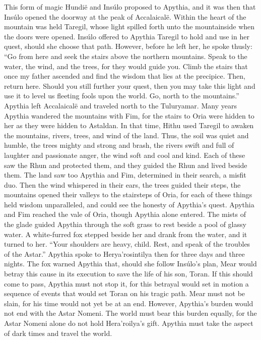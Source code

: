 \documentclass[smalldemyvopaper,11pt,twoside,onecolumn,openright,extrafontsizes]{memoir}
\begin{document}
This form of magic Hundië and Insúlo proposed to Apythia, and it was then that Insúlo opened the doorway at the peak of Accalaicalë. Within the heart of the mountain was held Taregil, whose light spilled forth unto the mountainside when the doors were opened. Insúlo offered to Apythia Taregil to hold and use in her quest, should she choose that path. However, before he left her, he spoke thusly:
“Go from here and seek the stairs above the northern mountains. Speak to the water, the wind, and the trees, for they would guide you. Climb the stairs that once my father ascended and find the wisdom that lies at the precipice. Then, return here. Should you still further your quest, then you may take this light and use it to level us fleeting fools upon the world. Go, north to the mountains.”
Apythia left Accalaicalë and traveled north to the Tuluryamar. Many years Apythia wandered the mountains with Fim, for the stairs to Oria were hidden to her as they were hidden to Astaldan. In that time, Hithu used Taregil to awaken the mountains, rivers, trees, and wind of the land. Thus, the soil was quiet and humble, the trees mighty and strong and brash, the rivers swift and full of laughter and passionate anger, the wind soft and cool and kind. Each of these saw the Rhun and protected them, and they guided the Rhun and lived beside them. The land saw too Apythia and Fim, determined in their search, a misfit duo. Then the wind whispered in their ears, the trees guided their steps, the mountains opened their valleys to the stairsteps of Oria, for each of these things held wisdom unparalleled, and could see the honesty of Apythia’s quest.
Apythia and Fim reached the vale of Oria, though Apythia alone entered. The mists of the glade guided Apythia through the soft grass to rest beside a pool of glassy water. A white-furred fox stepped beside her and drank from the water, and it turned to her.
“Your shoulders are heavy, child. Rest, and speak of the troubles of the Astar.” Apythia spoke to Herya’rosintilya then for three days and three nights. The fox warned Apythia that, should she follow Insúlo’s plan, Mear would betray this cause in its execution to save the life of his son, Toran. If this should come to pass, Apythia must not stop it, for this betrayal would set in motion a sequence of events that would set Toran on his tragic path. Mear must not be slain, for his time would not yet be at an end. However, Apythia’s burden would not end with the Astar Nomeni. The world must bear this burden equally, for the Astar Nomeni alone do not hold Hera’roilya’s gift. Apythia must take the aspect of dark times and travel the world.
\end{document}
